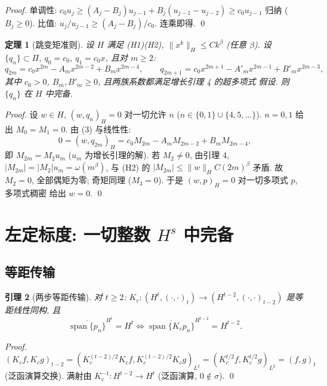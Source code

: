 \documentclass[UTF8]{ctexart}
\newtheorem{theorem}{定理}[section]
\newtheorem{lemma}[theorem]{引理}
\begin{document}
\begin{proof}
	单调性: $c_0 u_j \geq (A_j - B_j)u_{j-1} + B_j(u_{j-1} - u_{j-2})
	\geq c_0 u_{j-1}$ 归纳 ($B_j \geq 0$). 比值: $u_j/u_{j-1}
	\geq (A_j - B_j)/c_0$. 连乘即得. \qed
\end{proof}

\begin{theorem}[跳变矩准则]
	设 $H$ 满足 (H1)(H2), $\|x^k\|_H \leq C k^\beta$ (任意 $\beta$).
	设 $\{q_n\} \subset \Pi$, $q_0 = c_0$, $q_1 = c_0 x$, 且对 $m \geq 2$:
	\begin{equation}
		q_{2m} = c_0 x^{2m} - A_m x^{2m-2} + B_m x^{2m-4}, \qquad
		q_{2m+1} = c_0 x^{2m+1} - A'_m x^{2m-1} + B'_m x^{2m-3},
	\end{equation}
	其中 $c_0 > 0$, $B_m, B'_m \geq 0$, 且两族系数都满足增长引理 4 的超多项式
	假设. 则 $\{q_n\}$ 在 $H$ 中完备.
\end{theorem}

\begin{proof}
	设 $w \in H$, $(w, q_n)_H = 0$ 对一切允许 $n$ ($n \in \{0,1\} \cup
	\{4,5,\dots\}$). $n=0,1$ 给出 $M_0 = M_1 = 0$. 由 (3) 与线性性:
	\[
		0 = (w, q_{2m})_H = c_0 M_{2m} - A_m M_{2m-2} + B_m M_{2m-4},
	\]
	即 $M_{2m} = M_2 u_m$ ($u_m$ 为增长引理的解). 若 $M_2 \neq 0$, 由引理 4,
	$|M_{2m}| = |M_2| u_m = \omega(m^\beta)$, 与 (H2) 的
	$|M_{2m}| \leq \|w\|_H C (2m)^\beta$ 矛盾. 故 $M_2 = 0$, 全部偶矩为零;
	奇矩同理 ($M_3 = 0$). 于是 $(w, p)_H = 0$ 对一切多项式 $p$, 多项式稠密
	给出 $w = 0$. \qed
\end{proof}

\section{左定标度: 一切整数 \texorpdfstring{$H^s$}{Hs} 中完备}

\subsection{等距传输}

\begin{lemma}[两步等距传输]
	对 $t \geq 2$: $K_c: (H^t, (\cdot,\cdot)_t) \to (H^{t-2}, (\cdot,\cdot)_{t-2})$
	是等距线性同构, 且
	\[
		\overline{\operatorname{span}\{p_n\}}^{H^t} = H^t
		\iff
		\overline{\operatorname{span}\{K_c p_n\}}^{H^{t-2}} = H^{t-2}.
	\]
\end{lemma}

\begin{proof}
	$(K_c f, K_c g)_{t-2} = (K_c^{(t-2)/2}K_c f, K_c^{(t-2)/2}K_c g)_{L^2}
	= (K_c^{t/2}f, K_c^{t/2}g)_{L^2} = (f,g)_t$ (泛函演算交换).
	满射由 $K_c^{-1}: H^{t-2} \to H^t$ (泛函演算, $0 \notin \sigma$). \qed
\end{proof}
\end{document}
